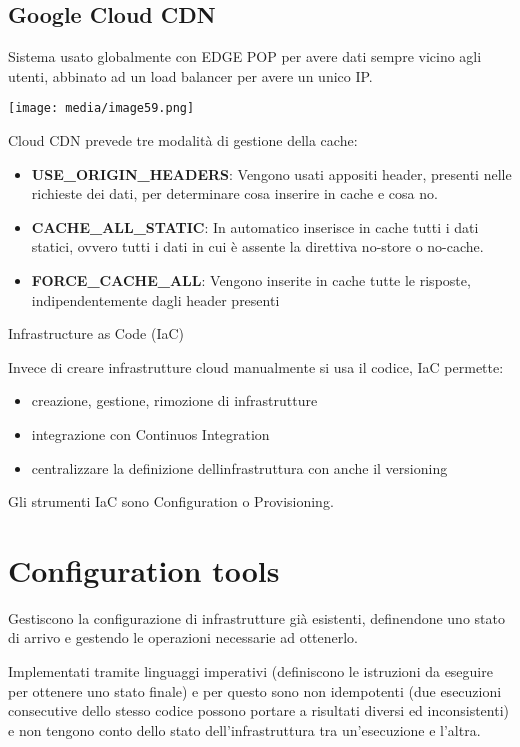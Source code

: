\subsection{Google Cloud CDN}\label{google-cloud-cdn}

Sistema usato globalmente con EDGE POP per avere dati sempre vicino agli
utenti, abbinato ad un load balancer per avere un unico IP.

\texttt{[image: media/image59.png]}

Cloud CDN prevede tre modalità di gestione della cache:

\begin{itemize}
\item
  \textbf{USE\_ORIGIN\_HEADERS}: Vengono usati appositi header, presenti
  nelle richieste dei dati, per determinare cosa inserire in cache e
  cosa no.
\item
  \textbf{CACHE\_ALL\_STATIC}: In automatico inserisce in cache tutti i
  dati statici, ovvero tutti i dati in cui è assente la direttiva
  no-store o no-cache.
\item
  \textbf{FORCE\_CACHE\_ALL}: Vengono inserite in cache tutte le
  risposte, indipendentemente dagli header presenti
\end{itemize}

Infrastructure as Code (IaC)

Invece di creare infrastrutture cloud manualmente si usa il codice, IaC
permette:

\begin{itemize}
\item
  creazione, gestione, rimozione di infrastrutture
\item
  integrazione con Continuos Integration
\item
  centralizzare la definizione dell\textquotesingle infrastruttura con
  anche il versioning
\end{itemize}

Gli strumenti IaC sono Configuration o Provisioning.

\section{Configuration tools}\label{configuration-tools}

Gestiscono la configurazione di infrastrutture già esistenti,
definendone uno stato di arrivo e gestendo le operazioni necessarie ad
ottenerlo.

Implementati tramite linguaggi imperativi (definiscono le istruzioni da
eseguire per ottenere uno stato finale) e per questo sono non
idempotenti (due esecuzioni consecutive dello stesso codice possono
portare a risultati diversi ed inconsistenti) e non tengono conto dello
stato dell'infrastruttura tra un'esecuzione e l'altra.

